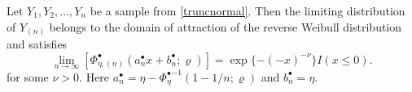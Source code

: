 \begin{comment}
\begin{split}
  \lim_{x\rightarrow \eta} \left( x\frac{(1-\Phi(x)/\Phi(\eta))}{\phi(x)/\Phi(\eta)} - 1 \right) \\ 
  = \left( \eta\frac{(1-\Phi(\eta)/\Phi(\eta))}{\phi(\eta)/\Phi(\eta)} - 1 \right) = -1.
\end{split}
\end{equation}
As we just showed the truncated normal distribution did not satisfy
the von-Mises criterion to determine if $F \in D(\Lambda)$. This was
expected since the convergence to Gumbel depends on the behavior of
the tails, if the tails are large enough, i.e., $\eta$ large, then the
above goes approximately to 0. The Mills ratio will be proportional to
$1/x$. In a sense we can assume that at the beginning we can have
values large enough to approach the Gumbel distribution. To find a
limiting distribution for the truncated normal case. Now we move to
the second limiting distribution in the extreme value family, the
reverse Weibull.
\end{comment}
\begin{theorem}
\label{theo:indeptruncnormal}
Let $Y_1,Y_2,\ldots,Y_n$ be a sample from \eqref{truncnormal}. Then
the limiting distribution of $Y_{(n)} $ %
  belongs to the domain of attraction of the reverse Weibull
distribution and satisfies
\begin{equation}
  \label{rev.weibull}
  \lim_{n\rightarrow\infty}[\Phi^{\bullet}_{\eta,(n)}(a^\bullet_nx+b_n^\bullet;\varrho)] = \exp{\{-(-x)^{-\nu}\}} I(x \leq 0).
\end{equation}
for some $\nu >0$. Here $a_n^\bullet = \eta - {\Phi_\eta^\bullet}^{-1}(1-1/n;\varrho)$ and $b_n^\bullet = \eta$.
\end{theorem}
